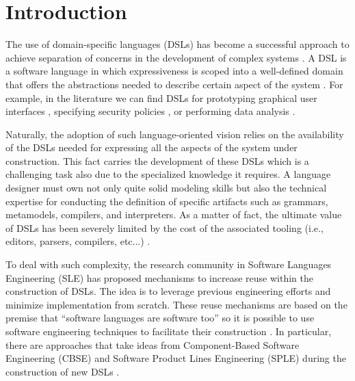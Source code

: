 \section{Introduction}
\label{sec:introduction}

The use of domain-specific languages (DSLs) has become a successful approach to achieve separation of concerns in the development of complex systems \cite{Cook:2006}. A DSL is a software language in which expressiveness is scoped into a well-defined domain that offers the abstractions needed to describe certain aspect of the system \cite{Combemale:2014}. For example, in the literature we can find DSLs for prototyping graphical user interfaces \cite{Oney:2012}, specifying security policies \cite{Lodderstedt:2002}, or performing data analysis \cite{Eberius:2012}. 

Naturally, the adoption of such language-oriented vision relies on the availability of the DSLs needed for expressing all the aspects of the system under construction. This fact carries the development of these DSLs which is a challenging task also due to the specialized knowledge it requires. A language designer must own not only quite solid modeling skills but also the technical expertise for conducting the definition of specific artifacts such as grammars, metamodels, compilers, and interpreters. As a matter of fact, the ultimate value of DSLs has been severely limited by the cost of the associated tooling (i.e., editors, parsers, compilers, etc...) \cite{jezequel:2014}.

To deal with such complexity, the research community in Software Languages Engineering (SLE) has proposed mechanisms to increase reuse within the construction of DSLs. The idea is to leverage previous engineering efforts and minimize implementation from scratch. These reuse mechanisms are based on the premise that ``software languages are software too'' \cite{Favre:2011} so it is possible to use software engineering techniques to facilitate their construction \cite{Kleppe:2009}. In particular, there are approaches that take ideas from Component-Based Software Engineering (CBSE) and Software Product Lines Engineering (SPLE) during the construction of new DSLs \cite{Liebig:2013,Cazzola:2013b,White:2009}.

